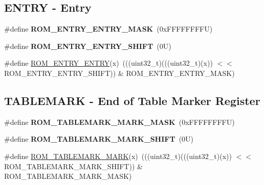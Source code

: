 \subsection*{E\+N\+T\+RY -\/ Entry}
\begin{DoxyCompactItemize}
\item 
\mbox{\label{group___r_o_m___register___masks_ga1857448185c74895d4ba462f8ebd76a9}} 
\#define {\bfseries R\+O\+M\+\_\+\+E\+N\+T\+R\+Y\+\_\+\+E\+N\+T\+R\+Y\+\_\+\+M\+A\+SK}~(0x\+F\+F\+F\+F\+F\+F\+F\+F\+U)
\item 
\mbox{\label{group___r_o_m___register___masks_gaef045dcd4648ca2c223f191d1e013673}} 
\#define {\bfseries R\+O\+M\+\_\+\+E\+N\+T\+R\+Y\+\_\+\+E\+N\+T\+R\+Y\+\_\+\+S\+H\+I\+FT}~(0\+U)
\item 
\#define \mbox{\hyperlink{group___r_o_m___register___masks_gaffee58a0a8c0c3f652a6f88007194dc8}{R\+O\+M\+\_\+\+E\+N\+T\+R\+Y\+\_\+\+E\+N\+T\+RY}}(x)~(((uint32\+\_\+t)(((uint32\+\_\+t)(x)) $<$$<$ R\+O\+M\+\_\+\+E\+N\+T\+R\+Y\+\_\+\+E\+N\+T\+R\+Y\+\_\+\+S\+H\+I\+FT)) \& R\+O\+M\+\_\+\+E\+N\+T\+R\+Y\+\_\+\+E\+N\+T\+R\+Y\+\_\+\+M\+A\+SK)
\end{DoxyCompactItemize}
\subsection*{T\+A\+B\+L\+E\+M\+A\+RK -\/ End of Table Marker Register}
\begin{DoxyCompactItemize}
\item 
\mbox{\label{group___r_o_m___register___masks_gaac600c2f3e33e425e374ca4f843d63e6}} 
\#define {\bfseries R\+O\+M\+\_\+\+T\+A\+B\+L\+E\+M\+A\+R\+K\+\_\+\+M\+A\+R\+K\+\_\+\+M\+A\+SK}~(0x\+F\+F\+F\+F\+F\+F\+F\+F\+U)
\item 
\mbox{\label{group___r_o_m___register___masks_gaffb544cfa94716cfd71a99bb45c7411a}} 
\#define {\bfseries R\+O\+M\+\_\+\+T\+A\+B\+L\+E\+M\+A\+R\+K\+\_\+\+M\+A\+R\+K\+\_\+\+S\+H\+I\+FT}~(0\+U)
\item 
\#define \mbox{\hyperlink{group___r_o_m___register___masks_ga38bfb1952b2f112abc1e01ce0d2d24b1}{R\+O\+M\+\_\+\+T\+A\+B\+L\+E\+M\+A\+R\+K\+\_\+\+M\+A\+RK}}(x)~(((uint32\+\_\+t)(((uint32\+\_\+t)(x)) $<$$<$ R\+O\+M\+\_\+\+T\+A\+B\+L\+E\+M\+A\+R\+K\+\_\+\+M\+A\+R\+K\+\_\+\+S\+H\+I\+FT)) \& R\+O\+M\+\_\+\+T\+A\+B\+L\+E\+M\+A\+R\+K\+\_\+\+M\+A\+R\+K\+\_\+\+M\+A\+SK)
\end{DoxyCompactItemize}
